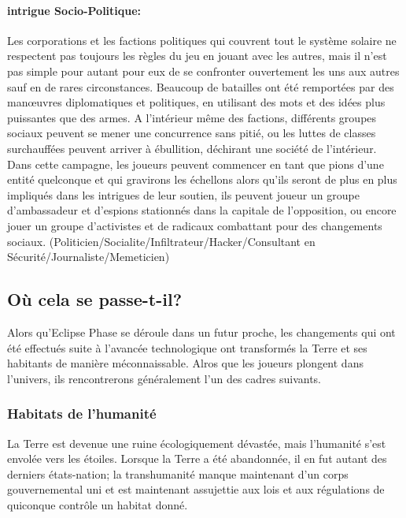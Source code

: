 \paragraph{intrigue Socio-Politique:} Les corporations et les factions politiques qui couvrent tout le système solaire ne respectent pas toujours les règles du jeu en jouant avec les autres, mais il n'est pas simple pour autant pour eux de se confronter ouvertement les uns aux autres sauf en de rares circonstances. Beaucoup de batailles ont été remportées par des manœuvres diplomatiques et politiques, en utilisant des mots et des idées plus puissantes que des armes. A l'intérieur même des factions, différents groupes sociaux peuvent se mener une concurrence sans pitié, ou les luttes de classes surchauffées  peuvent arriver à ébullition, déchirant une société de l'intérieur. Dans cette campagne, les joueurs peuvent commencer en tant que pions d'une entité quelconque et qui gravirons les échellons alors qu'ils seront de plus en plus impliqués dans les intrigues de leur soutien, ils peuvent joueur un groupe d'ambassadeur et d'espions stationnés dans la capitale de l'opposition, ou encore jouer un groupe d'activistes et de radicaux combattant pour des changements sociaux. (Politicien/Socialite/Infiltrateur/Hacker/Consultant en Sécurité/Journaliste/Memeticien) 



\subsection{Où cela se passe-t-il?} \label{sec:where-does-it} 

Alors qu'Eclipse Phase se déroule dans un futur proche, les changements qui ont été effectués suite à l'avancée technologique ont transformés la Terre et ses habitants de manière méconnaissable. Alros que les joueurs plongent dans l'univers, ils rencontrerons généralement l'un des cadres suivants. 



\subsubsection{Habitats de l'humanité} \label{sec:humanitys-habitats} 

La Terre est devenue une ruine écologiquement dévastée, mais l'humanité s'est envolée vers les étoiles. Lorsque la Terre a été abandonnée,  il en fut autant des derniers états-nation; la transhumanité manque maintenant d'un corps gouvernemental uni et est maintenant assujettie aux lois et aux régulations de quiconque contrôle un habitat donné. 

